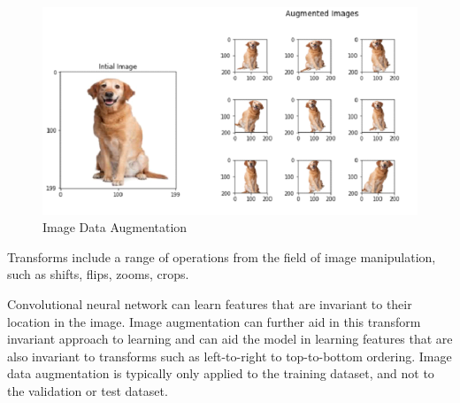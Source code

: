\begin{figure}[h]
	\centering
	\includegraphics[scale=0.5]{Figs/dataaug.png}
    \caption{Image Data Augmentation}
    \label{dataaug}
\end{figure}
Transforms include a range of operations from the field of image manipulation, such as shifts, flips, zooms, crops.

Convolutional neural network can learn features that are invariant to their location in the image. Image augmentation can further aid in this transform invariant approach to learning and can aid the model in learning features that are also invariant to transforms such as left-to-right to top-to-bottom ordering. Image data augmentation is typically only applied to the training dataset, and not to the validation or test dataset. 




